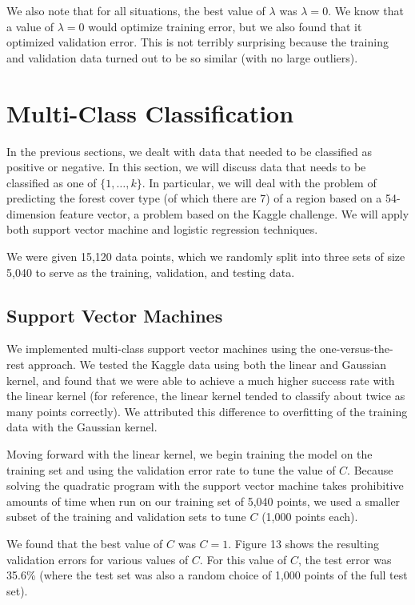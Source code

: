 \documentclass{sigchi}
\begin{document}
We also note that for all situations, the best value of $\lambda$ was $\lambda = 0$. We know that a value of $\lambda = 0$ would optimize training error, but we also found that it optimized validation error. This is not terribly surprising because the training and validation data turned out to be so similar (with no large outliers).


\section{Multi-Class Classification}

In the previous sections, we dealt with data that needed to be classified as positive or negative. In this section, we will discuss data that needs to be classified as one of $\{1, \hdots, k\}$. In particular, we will deal with the problem of predicting the forest cover type (of which there are 7) of a region based on a 54-dimension feature vector, a problem based on the Kaggle challenge. We will apply both support vector machine and logistic regression techniques.

We were given 15,120 data points, which we randomly split into three sets of size 5,040 to serve as the training, validation, and testing data.

\subsection{Support Vector Machines}

We implemented multi-class support vector machines using the one-versus-the-rest approach. We tested the Kaggle data using both the linear and Gaussian kernel, and found that we were able to achieve a much higher success rate with the linear kernel (for reference, the linear kernel tended to classify about twice as many points correctly). We attributed this difference to overfitting of the training data with the Gaussian kernel.

Moving forward with the linear kernel, we begin training the model on the training set and using the validation error rate to tune the value of $C$. Because solving the quadratic program with the support vector machine takes prohibitive amounts of time when run on our training set of 5,040 points, we used a smaller subset of the training and validation sets to tune $C$ (1,000 points each).

We found that the best value of $C$ was $C = 1$. Figure 13 shows the resulting validation errors for various values of $C$. For this value of $C$, the test error was 35.6\% (where the test set was also a random choice of 1,000 points of the full test set).
\end{document}
